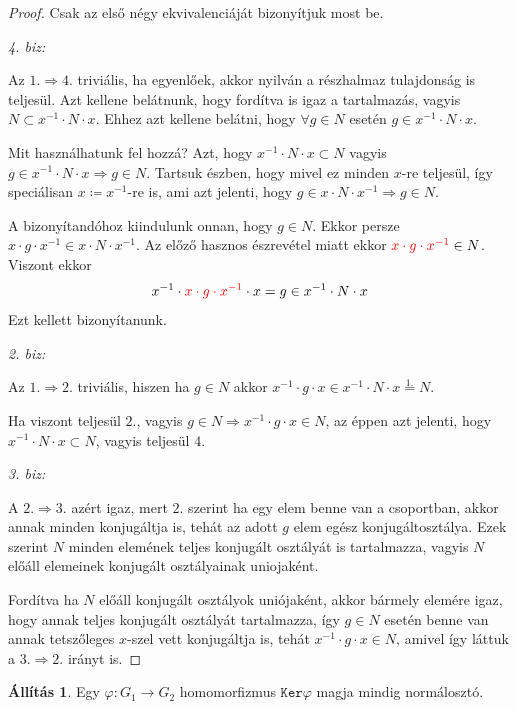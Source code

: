 \documentclass[12pt]{book}
\theoremstyle{plain} %
\theoremstyle{definition} %
\newtheorem{all/}{Állítás}[section]
\newenvironment{all}
{\renewcommand{\qedsymbol}{$\clubsuit$}%
	\pushQED{\qed}\begin{all/}}
	{\popQED\end{all/}}
\theoremstyle{remark}
\renewcommand\qedsymbol{$\blacksquare$}
\numberwithin{equation}{section}  %
\begin{document}
	\begin{proof}
	Csak az első négy ekvivalenciáját bizonyítjuk most be.
	
	\textit{4. biz:}
	
	Az $1.\Rightarrow 4.$ triviális, ha egyenlőek, akkor nyilván a részhalmaz tulajdonság is teljesül. Azt kellene belátnunk, hogy fordítva is igaz a tartalmazás, vagyis $N\subset x^{-1}\cdot N \cdot x$. Ehhez azt kellene belátni, hogy $\forall g\in N$ esetén $g\in x^{-1}\cdot N \cdot x$. 
	
	Mit használhatunk fel hozzá? Azt, hogy $x^{-1}\cdot N \cdot x \subset N$ vagyis $g\in x^{-1}\cdot N\cdot x \Rightarrow g\in N$. Tartsuk észben, hogy mivel ez minden $x$-re teljesül, így speciálisan $x\coloneqq x^{-1}$-re is, ami azt jelenti, hogy $g\in x\cdot N\cdot x^{-1} \Rightarrow g\in N$.
	
	A bizonyítandóhoz kiindulunk onnan, hogy $g\in N$. Ekkor persze $x\cdot g \cdot x^{-1} \in x \cdot N \cdot x^{-1}$. Az előző hasznos észrevétel miatt ekkor $\color{red}x\cdot g\cdot x^{-1}\color{black}\in N$. Viszont ekkor
	\[ x^{-1} \cdot \color{red} x \cdot g \cdot x^{-1}\color{black} \cdot x = g \in x^{-1} \cdot N \cdot x  \]
	Ezt kellett bizonyítanunk.
	
	\textit{2. biz:}
	
	Az $1.\Rightarrow 2.$ triviális, hiszen ha $g\in N$ akkor $x^{-1}\cdot g\cdot x\in x^{-1}\cdot N\cdot x \stackrel{1.}{=} N$.
	
	Ha viszont teljesül $2.$, vagyis $g\in N \Rightarrow x^{-1}\cdot g\cdot x \in N$, az éppen azt jelenti, hogy $x^{-1}\cdot N \cdot x \subset N$, vagyis teljesül $4.$%
	
	\textit{3. biz:}
	
	A $2. \Rightarrow 3.$ azért igaz, mert $2.$ szerint ha egy elem benne van a csoportban, akkor annak minden konjugáltja is, tehát az adott $g$ elem egész konjugáltosztálya. Ezek szerint $N$ minden elemének teljes konjugált osztályát is tartalmazza, vagyis $N$ előáll elemeinek konjugált osztályainak uniojaként.
	
	Fordítva ha $N$ előáll konjugált osztályok uniójaként, akkor bármely elemére igaz, hogy annak teljes konjugált osztályát tartalmazza, így $g\in N$ esetén benne van annak tetszőleges $x$-szel vett konjugáltja is, tehát $x^{-1}\cdot g \cdot x \in N$, amivel így láttuk a $3.\Rightarrow 2.$ irányt is.
	\end{proof}

	\begin{all}
		Egy $\varphi\colon G_1\to G_2$ homomorfizmus $\mathtt{Ker}\varphi$ magja mindig normálosztó.
	\end{all}
\end{document}
